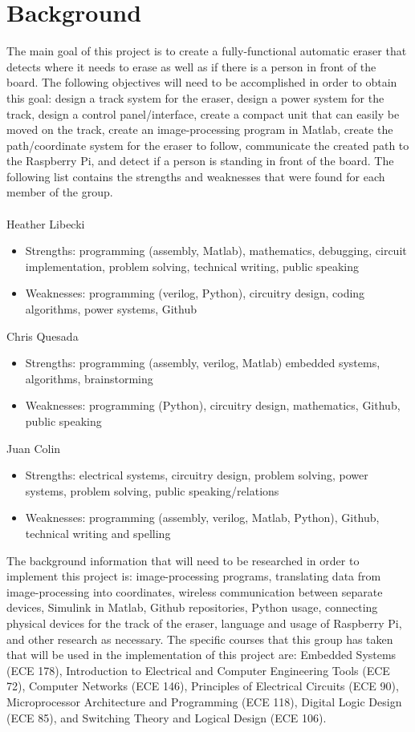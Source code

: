 \documentclass{IEEEtran}					%
\begin{document}
	\section{Background}
	The main goal of this project is to create a fully-functional automatic eraser that detects where it needs to erase as well as if there is a person in front of the board. The following objectives will need to be accomplished in order to obtain this goal: design a track system for the eraser, design a power system for the track, design a control panel/interface, create a compact unit that can easily be moved on the track, create an image-processing program in Matlab, create the path/coordinate system for the eraser to follow, communicate the created path to the Raspberry Pi, and detect if a person is standing in front of the board.
	The following list contains the strengths and weaknesses that were found for each member of the group.\\\\
	Heather Libecki
	\begin{itemize}
		\item Strengths: programming (assembly, Matlab), mathematics, debugging, circuit implementation, problem solving, technical writing, public speaking
	 	\item Weaknesses: programming (verilog, Python), circuitry design, coding algorithms, power systems, Github
 	\end{itemize}
 	Chris Quesada
	\begin{itemize}
		\item Strengths: programming (assembly, verilog, Matlab) embedded systems, algorithms, brainstorming
		\item Weaknesses: programming (Python), circuitry design, mathematics, Github, public speaking
	\end{itemize}
	Juan Colin
	\begin{itemize}
		\item Strengths: electrical systems, circuitry design, problem solving, power systems, problem solving, public speaking/relations
		\item Weaknesses: programming (assembly, verilog, Matlab, Python), Github, technical writing and spelling \\
	\end{itemize} 
	\par
	\setlength{\parindent}{5ex} 
	The background information that will need to be researched in order to implement this project is: image-processing programs, translating data from image-processing into coordinates, wireless communication between separate devices, Simulink in Matlab, Github repositories, Python usage, connecting physical devices for the track of the eraser, language and usage of Raspberry Pi, and other research as necessary. The specific courses that this group has taken that will be used in the implementation of this project are: Embedded Systems (ECE 178), Introduction to Electrical and Computer Engineering Tools (ECE 72), Computer Networks (ECE 146), Principles of Electrical Circuits (ECE 90), Microprocessor Architecture and Programming (ECE 118), Digital Logic Design (ECE 85), and Switching Theory and Logical Design (ECE 106).
	
\end{document}
